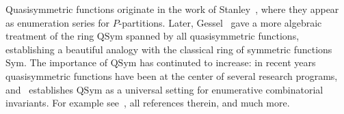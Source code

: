 \documentclass[12pt]{amsart}
\theoremstyle{definition}
\theoremstyle{remark}
\numberwithin{equation}{section}
\newcommand{\QQ}{\mathbb{Q}}
\newcommand{\Sym}{\mathrm{Sym}}
\newcommand{\QSym}{\mathrm{QSym}}
\begin{document}
%
%

%
%
%

Quasisymmetric functions originate in the work of Stanley~\cite{StanleyQSym}, where they appear as enumeration series for $P$-partitions.  
Later, Gessel~\cite{Gessel} gave a more algebraic treatment of the ring $\QSym$ spanned by all quasisymmetric functions, establishing a beautiful analogy with the classical ring of symmetric functions $\Sym$. 
The importance of $\QSym$ has continuted to increase: in recent years quasisymmetric functions have been at the center of several research programs, and~\cite{ABS} establishes $\QSym$ as a universal setting for enumerative combinatorial invariants. For example see~\cite{Grinberg,LMvW, Mason}, all references therein, and much more.
\end{document}
